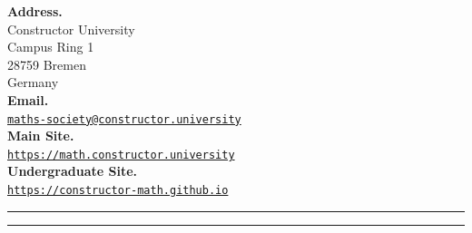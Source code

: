 \begin{minipage}[t]{0.47\textwidth}
  \vspace{\internal}
  \textbf{Address.}\\
  Constructor University \\
  Campus Ring 1\\
  28759 Bremen\\
  Germany\\[0.2cm]
  \textbf{Email.}\\
  \href{mailto:constructor.maths@gmail.com}{
    \texttt{maths-society@constructor.university}
    }\\[0.2cm]
  \textbf{Main Site.}\\
  \href{https://math.constructor.university/}{
    \texttt{https://math.constructor.university}
  }\\[0.2cm]
  \textbf{Undergraduate Site.}\\
  \href{https://constructor-math.github.io/Home Page/landing.html}{
    \texttt{https://constructor-math.github.io}
    }\\

  \vspace{\external}

  \noindent\textcolor{cmjgold}{\rule{\textwidth}{1.2pt}}


\end{minipage}

\vspace{0.8cm}
\noindent\textcolor{cmjgold}{\rule{\textwidth}{1.2pt}}
